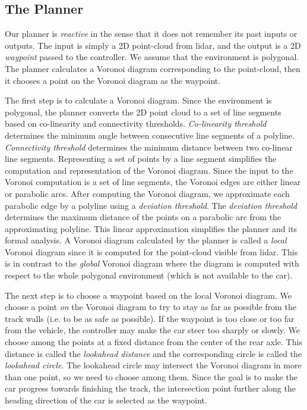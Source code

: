 \subsection{The Planner}
\label{sec:voronoiplanner}

Our planner is \emph{reactive} in the sense that it does not remember its past inputs or outputs.
%
The input is simply a 2D point-cloud from lidar, and the output is a 2D \emph{waypoint} passed to the controller.
%
We assume that the environment is polygonal.
%
The planner calculates a Voronoi diagram corresponding to the point-cloud, then it chooses a point on the Voronoi diagram as the waypoint.

The first step is to calculate a Voronoi diagram.
%
Since the environment is polygonal, the planner converts the 2D point cloud to a set of line segments based on co-linearity and connectivity thresholds.
%
\emph{Co-linearity threshold} determines the minimum angle between consecutive line segments of a polyline.
%
\emph{Connectivity threshold} determines the minimum distance between two co-linear line segments.
%
Representing a set of points by a line segment simplifies the computation and representation of the Voronoi diagram.
%
Since the input to the Voronoi computation is a set of line segments, the Voronoi edges are either linear or parabolic arcs.
%
After computing the Voronoi diagram, we approximate each parabolic edge by a polyline using a \emph{deviation threshold}.
%
The \emph{deviation threshold} determines the maximum distance of the points on a parabolic arc from the approximating polyline.
%
This linear approximation simplifies the planner and its formal analysis.
%
A Voronoi diagram calculated by the planner is called a \emph{local} Voronoi diagram since it is computed for the point-cloud visible from lidar.
%
This is in contrast to the \emph{global} Voronoi diagram where the diagram is computed with respect to the whole polygonal environment (which is not available to the car).

The next step is to choose a waypoint based on the local Voronoi diagram.
%
We choose a point \emph{on} the Voronoi diagram to try to stay as far as possible from the track walls (i.e. to be as safe as possible).
%
If the waypoint is too close or too far from the vehicle, the controller may make the car steer too sharply or slowly.
%
We choose among the points at a fixed distance from the center of the rear axle.
%
This distance is called the \emph{lookahead distance} and the corresponding circle is called the \emph{lookahead circle}.
%
The lookahead circle may intersect the Voronoi diagram in more than one point, so we need to choose among them.
%
Since the goal is to make the car progress towards finishing the track, the intersection point further along the heading direction of the car is selected as the waypoint.
